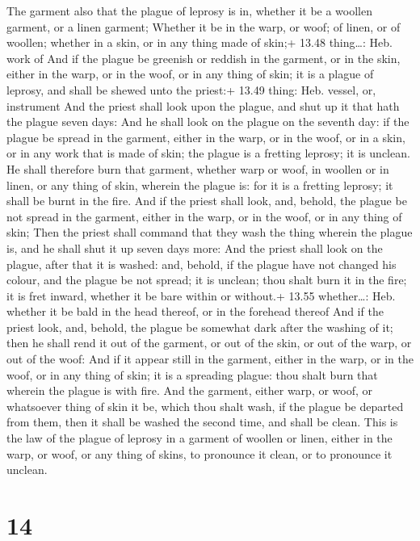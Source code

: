  The garment also that the plague of leprosy is in,
whether it be a woollen garment, or a linen garment; 
Whether it be in the warp, or woof; of linen, or of woollen; whether in
a skin, or in any thing made of skin;+ 13.48 thing\ldots: Heb. work of
 And if the plague be greenish or reddish in the garment,
or in the skin, either in the warp, or in the woof, or in any thing of
skin; it is a plague of leprosy, and shall be shewed unto the priest:+
13.49 thing: Heb. vessel, or, instrument  And the priest
shall look upon the plague, and shut up it that hath the plague seven
days:  And he shall look on the plague on the seventh day:
if the plague be spread in the garment, either in the warp, or in the
woof, or in a skin, or in any work that is made of skin; the plague is a
fretting leprosy; it is unclean.  He shall therefore burn
that garment, whether warp or woof, in woollen or in linen, or any thing
of skin, wherein the plague is: for it is a fretting leprosy; it shall
be burnt in the fire.  And if the priest shall look, and,
behold, the plague be not spread in the garment, either in the warp, or
in the woof, or in any thing of skin;  Then the priest
shall command that they wash the thing wherein the plague is, and he
shall shut it up seven days more:  And the priest shall
look on the plague, after that it is washed: and, behold, if the plague
have not changed his colour, and the plague be not spread; it is
unclean; thou shalt burn it in the fire; it is fret inward, whether it
be bare within or without.+ 13.55 whether\ldots: Heb. whether it be bald
in the head thereof, or in the forehead thereof  And if the
priest look, and, behold, the plague be somewhat dark after the washing
of it; then he shall rend it out of the garment, or out of the skin, or
out of the warp, or out of the woof:  And if it appear
still in the garment, either in the warp, or in the woof, or in any
thing of skin; it is a spreading plague: thou shalt burn that wherein
the plague is with fire.  And the garment, either warp, or
woof, or whatsoever thing of skin it be, which thou shalt wash, if the
plague be departed from them, then it shall be washed the second time,
and shall be clean.  This is the law of the plague of
leprosy in a garment of woollen or linen, either in the warp, or woof,
or any thing of skins, to pronounce it clean, or to pronounce it
unclean.

\hypertarget{section-13}{%
\section{14}\label{section-13}}

